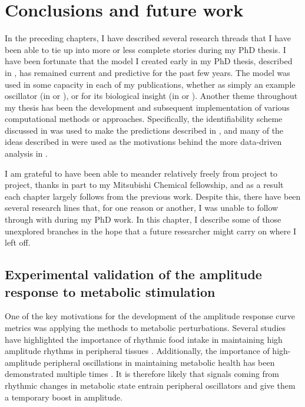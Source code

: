 \chapter{Conclusions and future work}

In the preceding chapters, I have described several research threads that I have been able to tie up into more or less complete stories during my PhD thesis.
I have been fortunate that the model I created early in my PhD thesis, described in , has remained current and predictive for the past few years.
The model was used in some capacity in each of my publications, whether as simply an example oscillator (in  or ), or for its biological insight (in  or ).
Another theme throughout my thesis has been the development and subsequent implementation of various computational methods or approaches.
Specifically, the identifiability scheme discussed in  was used to make the predictions described in , and many of the ideas described in  were used as the motivations behind the more data-driven analysis in .

I am grateful to have been able to meander relatively freely from project to project, thanks in part to my Mitsubishi Chemical fellowship, and as a result each chapter largely follows from the previous work.
Despite this, there have been several research lines that, for one reason or another, I was unable to follow through with during my PhD work.
In this chapter, I describe some of those unexplored branches in the hope that a future researcher might carry on where I left off.

\section{Experimental validation of the amplitude response to metabolic stimulation}

One of the key motivations for the development of the amplitude response curve metrics was applying the methods to metabolic perturbations.
Several studies have highlighted the importance of rhythmic food intake in maintaining high amplitude rhythms in peripheral tissues \cite{Vollmers2009, Hatori2012}.
Additionally, the importance of high-amplitude peripheral oscillations in maintaining metabolic health has been demonstrated multiple times \cite{Hatori2012, Marcheva2010}.
It is therefore likely that signals coming from rhythmic changes in metabolic state entrain peripheral oscillators and give them a temporary boost in amplitude.


